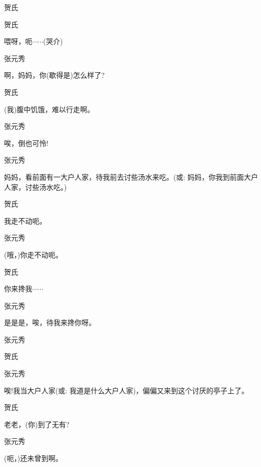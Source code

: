 贺氏\hspace{30pt}~


贺氏\hspace{30pt}~

喂呀，呃$\cdots{}\cdots{}$(哭介)

张元秀\hspace{20pt}~

啊，妈妈，你(歇得是)怎么样了?

贺氏\hspace{30pt}~

(我)腹中饥饿，难以行走啊。

张元秀\hspace{20pt}~

唉，倒也可怜!

张元秀

妈妈，看前面有一大户人家，待我前去讨些汤水来吃。({\akai 或}: 妈妈，你我到前面大户人家，讨些汤水吃。)

贺氏\hspace{30pt}~

我走不动呃。

张元秀\hspace{20pt}~

(哦，)你走不动呃。

贺氏\hspace{30pt}~

你来搀我$\cdots{}\cdots{}$

张元秀\hspace{20pt}~

是是是，唉，待我来搀你呀。

张元秀\hspace{20pt}~


贺氏\hspace{30pt}~


张元秀

唉!我当大户人家({\akai 或}: 我道是什么大户人家)，偏偏又来到这个讨厌的亭子上了。

贺氏\hspace{30pt}~

老老，(你)到了无有?

张元秀\hspace{20pt}~

(呃，)还未曾到啊。

